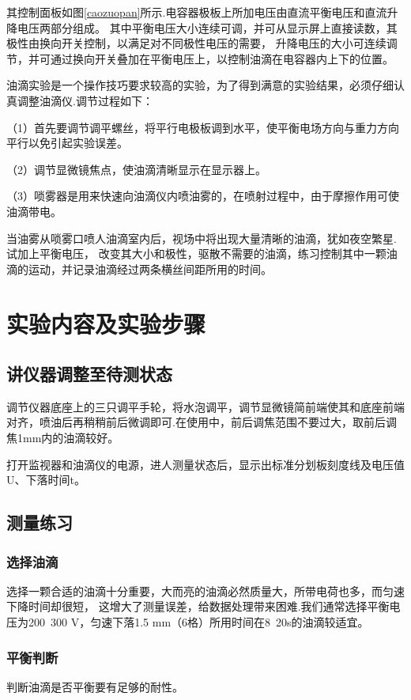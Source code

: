 \documentclass{ctexart}
\begin{document}
其控制面板如图\ref{caozuopan}所示.电容器极板上所加电压由直流平衡电压和直流升降电压两部分组成。
其中平衡电压大小连续可调，并可从显示屏上直接读数，其极性由换向开关控制，以满足对不同极性电压的需要，
升降电压的大小可连续调节，并可通过换向开关叠加在平衡电压上，以控制油滴在电容器内上下的位置。

油滴实验是一个操作技巧要求较高的实验，为了得到满意的实验结果，必须仔细认真调整油滴仪.调节过程如下：

\noindent（1）首先要调节调平螺丝，将平行电极板调到水平，使平衡电场方向与重力方向平行以免引起实验误差。

\noindent（2）调节显微镜焦点，使油滴清晰显示在显示器上。

\noindent（3）唢雾器是用来快速向油滴仪内喷油雾的，在喷射过程中，由于摩擦作用可使油滴带电。

当油雾从唢雾口喷人油滴室内后，视场中将出现大量清晰的油滴，犹如夜空繁星.试加上平衡电压，
改变其大小和极性，驱散不需要的油滴，练习控制其中一颗油滴的运动，并记录油滴经过两条横丝间距所用的时间。
\newpage

\section{实验内容及实验步骤}
  \subsection{讲仪器调整至待测状态}
  调节仪器底座上的三只调平手轮，将水泡调平，调节显微镜简前端使其和底座前端对齐，喷油后再稍稍前后微调即可.在使用中，前后调焦范围不要过大，取前后调焦1mm内的油滴较好。

  打开监视器和油滴仪的电源，进人测量状态后，显示出标准分划板刻度线及电压值U、下落时间t。

  \subsection{测量练习}
    \subsubsection{选择油滴}
    选择一颗合适的油滴十分重要，大而亮的油滴必然质量大，所带电荷也多，而匀速下降时间却很短，
    这增大了测量误差，给数据处理带来困难.我们通常选择平衡电压为200~300 V，匀速下落1.5 mm（6格）所用时间在8~20s的油滴较适宜。

    \subsubsection{平衡判断}
    判断油滴是否平衡要有足够的耐性。
\end{document}
